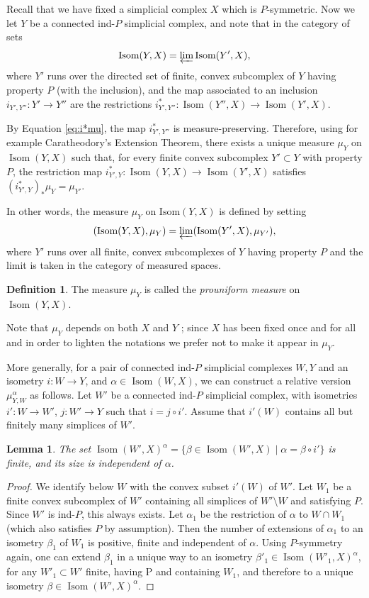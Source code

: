 \documentclass[a4paper, 11pt]{article}
\theoremstyle{plain}
\newtheorem{lemma}[proposition]{Lemma}
\theoremstyle{definition}
\newtheorem{definition}[proposition]{Definition}
\theoremstyle{remark}
\DeclareMathOperator{\Isom}{Isom}
\begin{document}
Recall that we have fixed a simplicial complex $X$ which is $P$-symmetric. Now we let $Y$ be a connected ind-$P$ simplicial complex, and note that in the category of sets
\[ \text{Isom}(Y,X) = \varprojlim \text{Isom}(Y',X), \]
where $Y'$ runs over the directed set of finite, convex subcomplex of $Y$ having property $P$ (with the inclusion), and the map associated to an inclusion $i_{Y',Y''}:Y'\to Y''$ are the restrictions $i_{Y',Y''}^*:\Isom(Y'',X)\to \Isom(Y',X)$. 

By Equation \eqref{eq:i*mu}, the map $i_{Y',Y''}^*$ is measure-preserving. Therefore, using for example Caratheodory's Extension Theorem, there exists a unique measure $\mu_Y$ on $\Isom(Y,X)$ such that, for every finite convex subcomplex $Y'\subset Y$ with property $P$, the restriction map $i_{Y',Y}^*:\Isom(Y,X)\to \Isom(Y',X)$ satisfies $(i_{Y',Y}^*)_*\mu_Y=\mu_{Y'}$.


In other words, the measure $\mu_Y$ on $\text{Isom}(Y,X)$ is defined by setting
\[ (\text{Isom}(Y,X),\mu_Y) = \varprojlim (\text{Isom}(Y',X),\mu_{Y'}), \]
where $Y'$ runs over all finite, convex subcomplexes of $Y$ having property $P$ and the limit is taken in the category of measured spaces.




\begin{definition}
The measure $\mu_Y$ is called the \emph{prouniform measure} on $\Isom(Y,X)$.
\end{definition}

Note that $\mu_Y$ depends on both $X$ and $Y$ ; since $X$ has been fixed once and for all and in order to lighten the notations we prefer not to make it appear in $\mu_Y$.






More generally, for a pair of connected ind-$P$ simplicial complexes $W,Y$ and an isometry $i:W \to Y$, and $\alpha\in \Isom(W,X)$, we can construct a relative version $\mu_{Y,W}^\alpha$ as follows.
Let $W'$ be a connected  ind-$P$ simplicial complex, with isometries $i':W\to W'$, $j:W'\to Y$ such that $i=j\circ i'$. Assume that $i'(W)$ contains all but finitely many simplices of $W'$.

\begin{lemma}
The set $\Isom(W',X)^\alpha=\{\beta\in \Isom(W',X)\mid \alpha=\beta\circ i'\}$ is finite, and its size is independent of $\alpha$.
\end{lemma}

\begin{proof}
We identify below $W$ with the convex subset $i'(W)$ of $W'$.
Let $W_1$ be a finite convex subcomplex  of $W'$ containing all simplices of $W'\setminus W$ and satisfying $P$. Since $W'$ is ind-$P$, this always exists. Let $\alpha_1$ be the restriction of $\alpha$ to $W \cap W_1$ (which also satisfies $P$ by assumption). Then the number of extensions of $\alpha_1$ to an isometry $\beta_1$ of $W_1$ is positive, finite and independent of $\alpha$. Using $P$-symmetry again, one can extend $\beta_1$ in a unique way to an isometry $\beta'_1\in \Isom(W'_1,X)^\alpha$, for any $W'_1\subset W'$ finite, having P and containing $W_1$, and therefore to a unique isometry $\beta\in \Isom(W',X)^\alpha$.
\end{proof}
\end{document}
